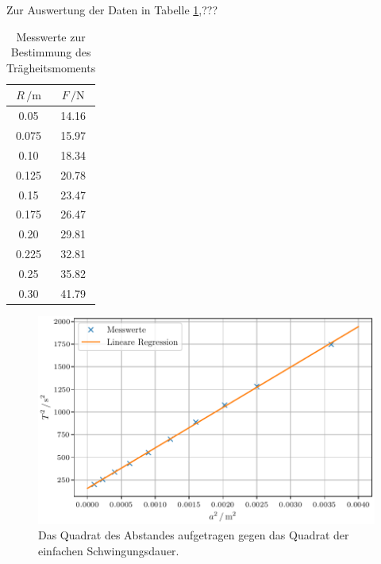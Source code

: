 Zur Auswertung der Daten in Tabelle \ref{tab:Traegheitsmoment},???

\begin{table}[H]
  \centering
  \caption{Messwerte zur Bestimmung des Trägheitsmoments}
  \label{tab:Traegheitsmoment}
  \begin{tabular}{
  c c
  }
    \toprule
     $R \, / \unit{\meter}$ & $F\, / \unit{\newton}$\\
    \midrule
    0.05  & 14.16 \\
    0.075 & 15.97 \\
    0.10  & 18.34 \\
    0.125 & 20.78 \\
    0.15  & 23.47 \\
    0.175 & 26.47 \\
    0.20  & 29.81 \\
    0.225 & 32.81 \\
    0.25  & 35.82 \\
    0.30  & 41.79 \\
    \bottomrule
  \end{tabular}
\end{table}
\begin{figure}[H]
  \centering
  \includegraphics[scale=0.6]{plotI_D.pdf}
  \caption{Das Quadrat des Abstandes aufgetragen gegen das Quadrat der einfachen Schwingungsdauer.}
  \label{fig:Plot1}
\end{figure}



